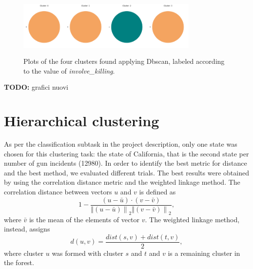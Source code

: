 \documentclass[10pt,a4paper]{report}
\begin{document}
\begin{figure}[h]
	\centering
	\includegraphics[width=0.2\textwidth]{dbscan_0}\includegraphics[width=0.2\textwidth]{dbscan_1}\includegraphics[width=0.2\textwidth]{dbscan_2}\includegraphics[width=0.2\textwidth]{dbscan_3}
	\caption{Plots of the four clusters found applying Dbscan, labeled according to the value of \textit{involve\_killing}.}
	\label{xmeans_killing}
\end{figure}

\textbf{TODO:} grafici nuovi

\section{Hierarchical clustering}

As per the classification subtask in the project description, only one state was chosen for this clustering task: the state of California, that is the second state per number of gun incidents (12980).
In order to identify the best metric for distance and the best method, we evaluated different trials.
The best results were obtained by using the correlation distance metric and the weighted linkage method.
The correlation distance between vectors $u$ and $v$ is defined as
$$1 - \frac{(u-\bar{u})\cdot(v-\bar{v})}{\left \Vert (u-\bar{u}) \right \|_2 \left \Vert (v-\bar{v}) \right \|_2},$$
where $\bar{v}$ is the mean of the elements of vector $v$.
The weighted linkage method, instead, assigns $$d(u,v) = \frac{dist(s,v)+dist(t,v)}{2},$$
where cluster $u$ was formed with cluster $s$ and $t$ and $v$ is a remaining cluster in the forest.
\end{document}
